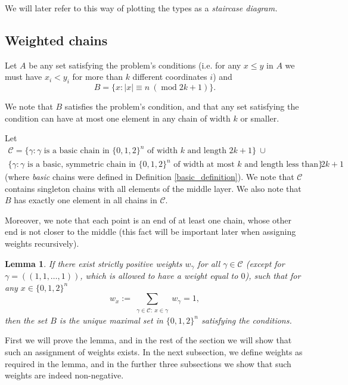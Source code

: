 \documentclass[11pt, reqno]{amsart}
\newtheorem{lemma}[theorem]{Lemma}
\numberwithin{equation}{section}
\newcommand{\cube}{\{0, 1, 2\}^n}
\newcommand\modd{\operatorname{mod}}
\begin{document}
We will later refer to this way of plotting the types as a \emph{staircase diagram.}

\subsection{Weighted chains}

Let $A$ be any set satisfying the problem's conditions (i.e. for any $x \leqslant y$ in $A$ we must have $x_i < y_i$ for more than $k$ different coordinates $i$) and
\begin{equation}
    B = \{x: |x| \equiv n \ (\modd 2k+1) \}.
\end{equation}

We note that $B$ satisfies the problem's condition, and that any set satisfying the condition can have at most one element in any chain of width $k$ or smaller.

Let
\begin{multline}
    \mathcal{C} = \Big\{ \gamma : \gamma \text{ is a basic chain in $\cube$ of width $k$ and length $2k+1$} \Big\} \ \cup\\
    \Big\{ \gamma : \gamma \text{ is a basic, symmetric chain in $\cube$ of width at most $k$ and length less than $2k+1$} \Big\}
\end{multline}
(where \emph{basic} chains were defined in Definition \ref{basic_definition}).
We note that $\mathcal{C}$ contains singleton chains with all elements of the middle layer. We also note that $B$ has exactly one element in all chains in $\mathcal{C}$.

Moreover, we note that each point is an end of at least one chain, whose other end is not closer to the middle (this fact will be important later when assigning weights recursively).

\begin{lemma}
\label{b11111_can_be_0}
    If there exist strictly positive weights $w_{\gamma}$ for all $\gamma \in \mathcal{C}$ (except for $\gamma=((1, 1, \dots, 1))$, which is allowed to have a weight equal to $0$), such that for any $x \in \cube$
    \begin{equation*}
        w_x := \sum_{\substack{\gamma \in \mathcal{C}: \ x \in \gamma}} w_{\gamma} = 1,
    \end{equation*}
    then the set $B$ is the unique maximal set in $\cube$ satisfying the conditions.
\end{lemma}

First we will prove the lemma, and in the rest of the section we will show that such an assignment of weights exists. In the next subsection, we define weights as required in the lemma, and in the further three subsections we show that such weights are indeed non-negative.
\end{document}
